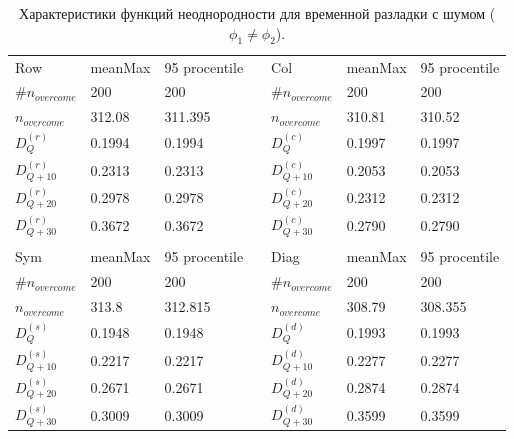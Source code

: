 \documentclass[specialist, substylefile = spbu.rtx,
			   subf, href, 12pt]{disser}
\begin{document}
\newpage
\begin{table}[!hhh]
	\caption{Характеристики функций неоднородности для временной разладки с шумом ($\phi_1 \neq \phi_2$).}
	\begin{tabular}{lllllll}
		Row & meanMax & 95 procentile &  & Col & meanMax & 95 procentile \\
		$\#n_{overcome}$ & 200 & 200 &  & $\#n_{overcome}$ & 200 & 200 \\
		$n_{overcome}$ & 312.08 & 311.395 &  & $n_{overcome}$ & 310.81 & 310.52 \\
		$D_Q^{(r)}$ & 0.1994 & 0.1994 &  & $D_Q^{(c)}$ & 0.1997 & 0.1997 \\
		$D_{Q+10}^{(r)}$ & 0.2313 & 0.2313 &  & $D_{Q+10}^{(c)}$ & 0.2053 & 0.2053 \\
		$D_{Q+20}^{(r)}$ & 0.2978 & 0.2978 &  & $D_{Q+20}^{(c)}$ & 0.2312 & 0.2312 \\
		$D_{Q+30}^{(r)}$ & 0.3672 & 0.3672 &  & $D_{Q+30}^{(c)}$ & 0.2790 & 0.2790 \\
		&  &  &  &  &  &  \\
		Sym & meanMax & 95 procentile &  & Diag & meanMax & 95 procentile \\
		$\#n_{overcome}$ & 200 & 200 &  & $\#n_{overcome}$ & 200 & 200 \\
		$n_{overcome}$ & 313.8 & 312.815 &  & $n_{overcome}$ & 308.79 & 308.355 \\
		$D_Q^{(s)}$ & 0.1948 & 0.1948 &  & $D_Q^{(d)}$ & 0.1993 & 0.1993 \\
		$D_{Q+10}^{(s)}$ & 0.2217 & 0.2217 &  & $D_{Q+10}^{(d)}$ & 0.2277 & 0.2277 \\
		$D_{Q+20}^{(s)}$ & 0.2671 & 0.2671 &  & $D_{Q+20}^{(d)}$ & 0.2874 & 0.2874 \\
		$D_{Q+30}^{(s)}$ & 0.3009 & 0.3009 &  & $D_{Q+30}^{(d)}$ & 0.3599 & 0.3599
	\end{tabular}
	\label{tab:TemporaryHeterogeneityNoisedShifted}
\end{table}
\end{document}
